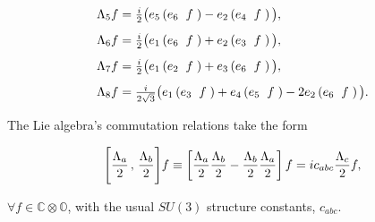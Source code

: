 \documentclass[letterpaper,12pt,titlepage,oneside,final]{book}
\begin{document}
\begin{equation}
\begin{array}{l}
  
\Lambda_5f = \frac{i}{2}\big(e_5\left(e_6\hspace{2mm} f\hspace{1mm}\right)-e_2\left(e_4 \hspace{2mm}f\hspace{1mm}\right) \big),  \vspace{3mm} \\


\Lambda_6f = \frac{i}{2}\big(e_1\left(e_6\hspace{2mm} f\hspace{1mm}\right)+e_2\left(e_3 \hspace{2mm}f\hspace{1mm}\right) \big),  \vspace{3mm} \\



\Lambda_7f = \frac{i}{2}\big(e_1\left(e_2\hspace{2mm} f\hspace{1mm}\right)+e_3\left(e_6 \hspace{2mm}f\hspace{1mm}\right) \big),  \vspace{3mm} \\


\Lambda_8f = \frac{i}{2\sqrt{3}}\big(e_1\left(e_3\hspace{2mm} f\hspace{1mm}\right)+e_4\left(e_5 \hspace{2mm}f\hspace{1mm}\right)   -    2e_2\left(e_6 \hspace{2mm}f\hspace{1mm}\right) \big).

\end{array}\end{equation}

\noindent  The Lie algebra's commutation relations take the form

\begin{equation}\label{comm}
\Bigg[ \frac{\Lambda_a}{2} \hspace{0.5mm} ,\hspace{0.5mm} \frac{\Lambda_b}{2} \Bigg] f \equiv \left[ \frac{\Lambda_a}{2} \frac{\Lambda_b}{2} -\frac{\Lambda_b}{2} \frac{\Lambda_a}{2} \right]f= ic_{abc} \frac{\Lambda_c}{2} f,
\end{equation}

\noindent $\forall f \in \mathbb{C}\otimes\mathbb{O}$, with the usual $SU(3)$ structure constants, $c_{abc}$.  
\end{document}
